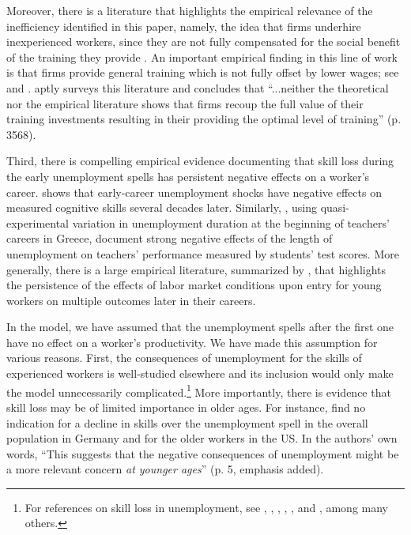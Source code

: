 \documentclass[12pt]{article} %
\theoremstyle{definition}
\begin{document}
Moreover, there is a literature that highlights the empirical relevance of the inefficiency identified in this paper, namely, the idea that firms underhire inexperienced workers, since they are not fully compensated for the social benefit of the training they provide \citep{becker2009human, acemoglu1998firms, acemoglu1999beyond}.
An important empirical finding in this line of work is that firms provide general training which is not fully offset by lower wages; see \cite{loewenstein1998dividing} and \cite{autor2001temporary}.
\cite{pallais2014inefficient} aptly surveys this literature and concludes that ``...neither the theoretical nor the empirical literature shows that firms recoup the full value of their training investments resulting in their providing the optimal level of training'' (p. 3568).



Third, there is compelling empirical evidence documenting that skill loss during the early unemployment spells has persistent negative effects on a worker's career.
\cite{arellano2022effect} shows that early-career unemployment shocks have negative effects on measured cognitive skills several decades later. 
Similarly, \cite{dinerstein2022human}, using quasi-experimental variation in unemployment duration at the beginning of teachers' careers in Greece, document strong negative effects of the length of unemployment on teachers' performance measured by students' test scores.
More generally, there is a large empirical literature, summarized by \cite{wachter2020persistent}, that highlights the persistence of the effects of labor market conditions upon entry for young workers on multiple outcomes later in their careers.


In the model, we have assumed that the unemployment spells after the first one have no effect on a worker's productivity.
We have made this assumption for various reasons. 
First, the consequences of unemployment for the skills of experienced workers is well-studied elsewhere and its inclusion would only make the model unnecessarily complicated.\footnote{For references on skill loss in unemployment, see \cite{pissarides1992loss}, \cite{ljungqvist1998european}, \cite{coles2000retraining}, \cite{ortego2016unemployment}, \cite{flemming2020skill}, and \cite{kospentaris2021unobserved}, among many others.}
More importantly, there is evidence that skill loss may be of limited importance in older ages.
For instance, \cite{cohen2023skill} find no indication for a decline in skills over the unemployment spell in the overall population in Germany and for the older workers in the US. In the authors' own words, ``This suggests that the negative consequences of unemployment might be a more relevant concern \textit{at younger ages}'' (p. 5, emphasis added).
\end{document}
